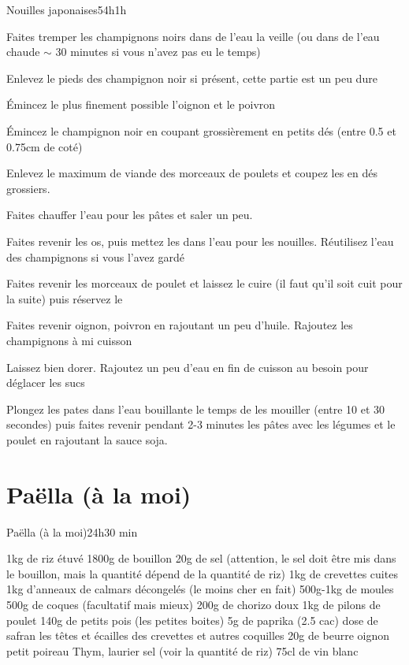 {\begin{recette}{Nouilles japonaises}{5}{4h}{1h}
\begin{preparation}
\item Faites tremper les champignons noirs dans de l'eau la veille (ou dans de l'eau chaude $\sim$ 30 minutes si vous n'avez pas eu le 
temps)
\begin{remarque}
Enlevez le pieds des champignon noir si présent, cette partie est un peu dure
\end{remarque}

\item Émincez le plus finement possible l'oignon et le poivron
\item Émincez le champignon noir en coupant grossièrement en petits dés (entre 0.5 et 0.75cm de coté)
\item Enlevez le maximum de viande des morceaux de poulets et coupez les en dés grossiers. 
\item Faites chauffer l'eau pour les pâtes et saler un peu.
\item Faites revenir les os, puis mettez les dans l'eau pour les nouilles. Réutilisez l'eau des champignons si vous l'avez gardé
\item Faites revenir les morceaux de poulet et laissez le cuire (il faut 
qu'il soit cuit pour la suite) puis réservez le
\item Faites revenir oignon, poivron en rajoutant un peu d'huile. Rajoutez les champignons à mi cuisson
\item Laissez bien dorer. Rajoutez un peu d'eau en fin de cuisson au besoin pour déglacer les sucs
\item Plongez les pates dans l'eau bouillante le temps de les mouiller (entre 10 et 30 secondes) puis faites revenir pendant 2-3 minutes les pâtes avec les 
légumes et le poulet en rajoutant la sauce soja.
\end{preparation}
\end{recette}

\section{Paëlla (à la moi)}
\begin{recette}{Paëlla (à la moi)}{2}{4h}{30 min}
\begin{ingredients}
\ingredient[Paella]
\ingredient 1kg de riz étuvé
\ingredient 1800g de bouillon
\ingredient 20g de sel (attention, le sel doit être mis dans le bouillon, mais la quantité dépend de la quantité de riz)
\ingredient 1kg de crevettes cuites
\ingredient 1kg d'anneaux de calmars décongelés (le moins cher en fait)
\ingredient 500g-1kg de moules
\ingredient 500g de coques (facultatif mais mieux)
\ingredient 200g de chorizo doux
\ingredient 1kg de pilons de poulet
\ingredient 140g de petits pois (les petites boites)
\ingredient 5g de paprika (2.5 cac)
 dose de safran
\ingredient les têtes et écailles des crevettes et autres coquilles
\ingredient 20g de beurre
 oignon
 petit poireau
\ingredient Thym, laurier
\ingredient sel (voir la quantité de riz)
\ingredient 75cl de vin blanc
\end{ingredients}


\end{recette}}
